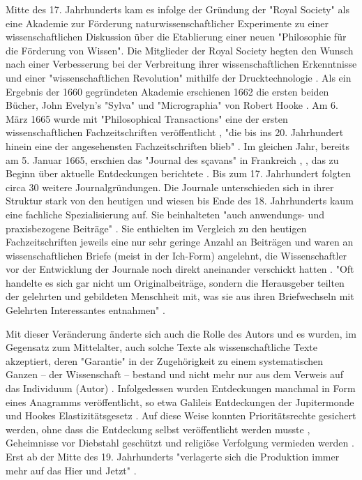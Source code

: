 Mitte des 17. Jahrhunderts kam es infolge der Gründung der "Royal Society" als eine Akademie zur Förderung naturwissenschaftlicher Experimente zu einer wissenschaftlichen Diskussion über die Etablierung einer neuen "Philosophie für die Förderung von Wissen". Die Mitglieder der Royal Society hegten den Wunsch nach einer Verbesserung bei der Verbreitung ihrer wissenschaftlichen Erkenntnisse und einer "wissenschaftlichen Revolution" mithilfe der Drucktechnologie \cite{Dear_1985}. Als ein Ergebnis der 1660 gegründeten Akademie erschienen 1662 die ersten beiden Bücher, John Evelyn's "Sylva" und "Micrographia" von Robert Hooke \cite{Hall_1992}. Am 6. März 1665 wurde mit "Philosophical Transactions" eine der ersten wissenschaftlichen Fachzeitschriften veröffentlicht \cite{Peters_2014}, "die bis ins 20. Jahrhundert hinein eine der angesehensten Fachzeitschriften blieb" \cite{Graefen_2007}. Im gleichen Jahr, bereits am  5. Januar 1665, erschien das "Journal des sçavans" in Frankreich \cite{Ball_2011}, \cite{Hollricher_2009}, das zu Beginn über aktuelle Entdeckungen berichtete \cite{Weiner_2001}. Bis zum 17. Jahrhundert folgten circa 30 weitere Journalgründungen. Die Journale unterschieden sich in ihrer Struktur stark von den heutigen und wiesen bis Ende des 18. Jahrhunderts kaum eine fachliche Spezialisierung auf. Sie beinhalteten "auch anwendungs- und praxisbezogene Beiträge" \cite{Graefen_2007}. Sie enthielten im Vergleich zu den heutigen Fachzeitschriften jeweils eine nur sehr geringe Anzahl an Beiträgen und waren an wissenschaftlichen Briefe (meist in der Ich-Form) angelehnt, die Wissenschaftler vor der Entwicklung der Journale noch direkt aneinander verschickt hatten \cite{Weiner_2001}. "Oft handelte es sich gar nicht um Originalbeiträge, sondern die Herausgeber teilten der gelehrten und gebildeten Menschheit mit, was sie aus ihren Briefwechseln mit Gelehrten Interessantes entnahmen" \cite{Graefen_2007}.

Mit dieser Veränderung änderte sich auch die Rolle des Autors und es wurden, im Gegensatz zum Mittelalter, auch solche Texte als wissenschaftliche Texte akzeptiert, deren "Garantie" in der Zugehörigkeit zu einem systematischen Ganzen – der Wissenschaft – bestand und nicht mehr nur aus dem Verweis auf das Individuum (Autor) \cite{Foucault_2000}. Infolgedessen wurden Entdeckungen manchmal in Form eines Anagramms veröffentlicht, so etwa Galileis Entdeckungen der Jupitermonde \cite{Miner_2007} und Hookes Elastizitätsgesetz \cite{Szabo_2013}. Auf diese Weise konnten Prioritätsrechte gesichert werden, ohne dass die Entdeckung selbst veröffentlicht werden musste \cite{Miner_2007}, Geheimnisse vor Diebstahl geschützt und religiöse Verfolgung vermieden werden \cite{Resnik_2005}. Erst ab der Mitte des 19. Jahrhunderts "verlagerte sich die Produktion immer mehr auf das Hier und Jetzt" \cite{Hagner_2015}.


